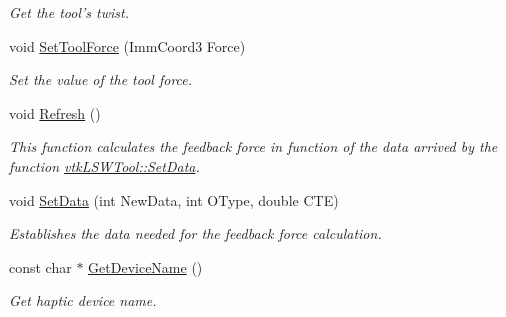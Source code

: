 \begin{DoxyCompactItemize}
\begin{DoxyCompactList}\small\item\em Get the tool's twist. \item\end{DoxyCompactList}\item 
\hypertarget{classvtkLSWTool_acdbab04fdd62c6d0970b5e5e78069ee5}{
void \hyperlink{classvtkLSWTool_acdbab04fdd62c6d0970b5e5e78069ee5}{SetToolForce} (ImmCoord3 Force)}
\label{classvtkLSWTool_acdbab04fdd62c6d0970b5e5e78069ee5}

\begin{DoxyCompactList}\small\item\em Set the value of the tool force. \item\end{DoxyCompactList}\item 
\hypertarget{classvtkLSWTool_ad3ca7acbc190b0d67efd5406a9f64671}{
void \hyperlink{classvtkLSWTool_ad3ca7acbc190b0d67efd5406a9f64671}{Refresh} ()}
\label{classvtkLSWTool_ad3ca7acbc190b0d67efd5406a9f64671}

\begin{DoxyCompactList}\small\item\em This function calculates the feedback force in function of the data arrived by the function \hyperlink{classvtkLSWTool_a8260d105dc4903f885a3d794842372a5}{vtkLSWTool::SetData}. \item\end{DoxyCompactList}\item 
\hypertarget{classvtkLSWTool_a8260d105dc4903f885a3d794842372a5}{
void \hyperlink{classvtkLSWTool_a8260d105dc4903f885a3d794842372a5}{SetData} (int NewData, int OType, double CTE)}
\label{classvtkLSWTool_a8260d105dc4903f885a3d794842372a5}

\begin{DoxyCompactList}\small\item\em Establishes the data needed for the feedback force calculation. \item\end{DoxyCompactList}\item 
\hypertarget{classvtkLSWTool_a44133dee01d12a6ba8ca549c858c89de}{
const char $\ast$ \hyperlink{classvtkLSWTool_a44133dee01d12a6ba8ca549c858c89de}{GetDeviceName} ()}
\label{classvtkLSWTool_a44133dee01d12a6ba8ca549c858c89de}

\begin{DoxyCompactList}\small\item\em Get haptic device name. \item\end{DoxyCompactList}\end{DoxyCompactItemize}
